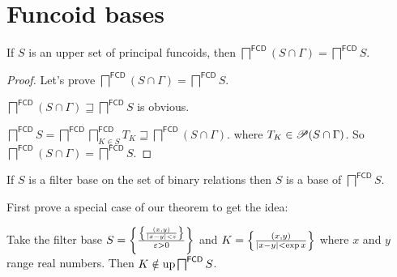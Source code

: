 \section{Funcoid bases}

\begin{lem}
If $S$ is an upper set of principal funcoids, then
$\bigsqcap^{\mathsf{FCD}} (S\cap\Gamma)=\bigsqcap^{\mathsf{FCD}} S$.
\end{lem}

\begin{proof}
  Let's prove $\bigsqcap^{\mathsf{FCD}} (S\cap\Gamma) = \bigsqcap^{\mathsf{FCD}} S$.
  
  $\bigsqcap^{\mathsf{FCD}} (S\cap\Gamma) \sqsupseteq \bigsqcap^{\mathsf{FCD}} S$ is obvious.
  
  $\bigsqcap^{\mathsf{FCD}} S = \bigsqcap^{\mathsf{FCD}} \bigsqcap^{\mathsf{FCD}}_{K\in S} T_K \sqsupseteq \bigsqcap^{\mathsf{FCD}} (S\cap\Gamma)$.
  where $T_K\in\mathscr{P} (S\cap\Gamma)$.
  So $\bigsqcap^{\mathsf{FCD}} (S\cap\Gamma) = \bigsqcap^{\mathsf{FCD}} S$.
\end{proof}

\begin{thm}
  If $S$ is a filter base on the set of binary relations then $S$ is a base of
  $\bigsqcap^{\mathsf{FCD}} S$.
\end{thm}

First prove a special case of our theorem to get the idea:

\begin{example}
  Take the filter base $S = \left\{ \frac{
  \left\{ \frac{ (x, y) }{ | x - y | < \varepsilon }\right\}}{ \varepsilon > 0 }\right\}$ and $K = \left\{ \frac{ (x, y) }{
  | x - y | < \exp x }\right\}$ where $x$ and $y$ range real
  numbers. Then $K \notin \operatorname{up} \bigsqcap^{\mathsf{FCD}} S$.
\end{example}

